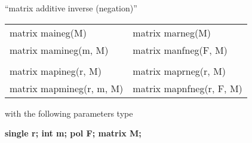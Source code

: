 % 
% 


\leer
\begin{center} ``matrix additive inverse (negation)'' \end{center}
\begin{center}
{\bf
\begin{tabular}{ll}
matrix maineg(M)   & matrix marneg(M)   \\
matrix mamineg(m, M)&  matrix manfneg(F, M) \\
&\\
matrix mapineg(r, M)   & matrix maprneg(r, M) \\
matrix mapmineg(r, m, M) & matrix mapnfneg(r, F, M) \\
\end{tabular} }
\end{center}
\parbox[t]{2.5in}{with the following parameters type}
\parbox[t]{3.0in}{
\bf single r;\newline
    int m;\newline
    pol F;\newline
    matrix M;}

